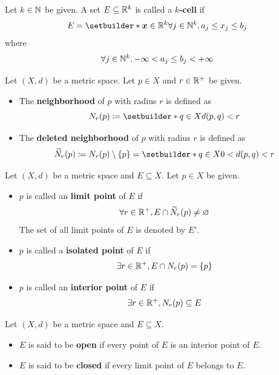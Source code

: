 \bigskip

\begin{definition} \label{an:def:k-cell}
    Let $k \in \N$ be given. A set $E \subseteq \R^{k}$ is called a \textbf{$k$-cell} if
    \[
    E = \setbuilder*{\bm{x} \in \R^{k}}{\forall j \in \N^{k}, a_{j} \leq x_{j} \leq b_{j}}
    \]
    where
    \[
    \forall j \in \N^{k}, - \infty < a_{j} \leq b_{j} < + \infty
    \]
\end{definition}

\bigskip

\begin{definition} \label{an:def:neighborhood-open-ball}
    Let $(X, d)$ be a metric space. Let $p \in X$ and $r \in \R^{+}$ be given.
    \begin{itemize}
        \item The \textbf{neighborhood} of $p$ with radius $r$ is defined as
        \[
        N_{r}(p) \coloneqq \setbuilder*{q \in X}{d(p, q) < r}
        \]
        \item The \textbf{deleted neighborhood} of $p$ with radius $r$ is defined as
        \[
        \widetilde{N}_{r}(p) \coloneqq N_{r}(p) \setminus \set*{p} = \setbuilder*{q \in X}{0 < d(p, q) < r}
        \]
    \end{itemize}
\end{definition}

\bigskip

\begin{definition} \label{an:def:limit-isolated-interior-points}
    Let $(X, d)$ be a metric space and $E \subseteq X$. Let $p \in X$ be given.
    \begin{itemize}
        \item $p$ is called an \textbf{limit point} of $E$ if
        \[
        \forall r \in \R^{+}, E \cap \widetilde{N}_{r}(p) \neq \vnot
        \]
        The set of all limit points of $E$ is denoted by $E'$.
        \item $p$ is called a \textbf{isolated point} of $E$ if
        \[
        \exists r \in \R^{+}, E \cap N_{r}(p) = \set*{p}
        \]
        \item $p$ is called an \textbf{interior point} of $E$ if
        \[
        \exists r \in \R^{+}, N_{r}(p) \subseteq E
        \]
    \end{itemize}
\end{definition}

\bigskip

\begin{definition} \label{an:def:open-closed-sets}
    Let $(X, d)$ be a metric space and $E \subseteq X$.
    \begin{itemize}
        \item $E$ is said to be \textbf{open} if every point of $E$ is an interior point of $E$.
        \item $E$ is said to be \textbf{closed} if every limit point of $E$ belongs to $E$.
    \end{itemize}
\end{definition}

